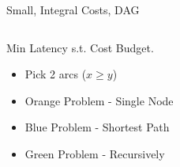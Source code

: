 \begin{frame}{Small, Integral Costs, DAG}
\begin{columns}
\begin{column}{.53\textwidth}

Min Latency s.t. Cost Budget.
\only<+>{}
\begin{itemize}[<+>]
  \item Pick 2 arcs ($x \geq y$)
  \item {\color{orange} Orange Problem} - Single Node
  \item {\color{blue} Blue Problem} - Shortest Path
  \item {\color{green} Green Problem} - Recursively 
\end{itemize}
\vspace{4cm}

\end{column}
\begin{column}{.6\textwidth}



\end{column}
\end{columns}
\end{frame}